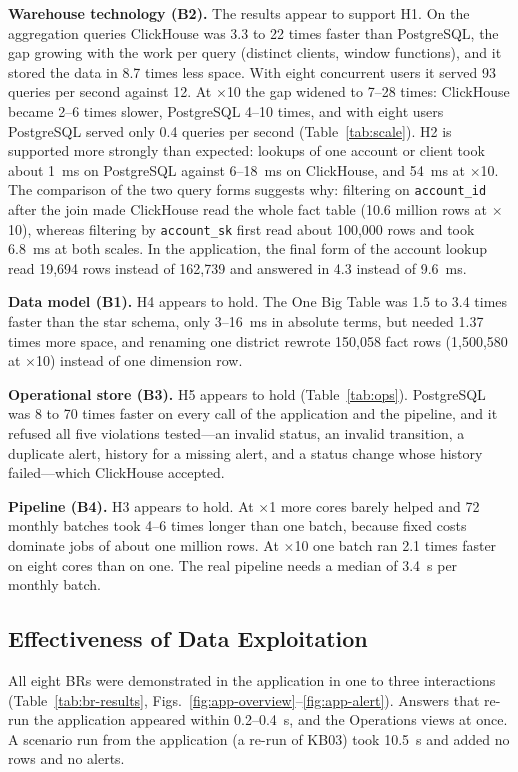 \documentclass[peerreview]{IEEEtran}
\newcommand{\tbl}[1]{\texttt{#1}}
\begin{document}
\textbf{Warehouse technology (B2).} The results appear to support H1. On the aggregation
queries ClickHouse was 3.3 to 22 times faster than PostgreSQL, the gap growing with the work
per query (distinct clients, window functions), and it stored the data in 8.7 times less
space. With eight concurrent users it served 93 queries per second against 12. At $\times$10
the gap widened to 7--28 times: ClickHouse became 2--6 times slower, PostgreSQL 4--10 times,
and with eight users PostgreSQL served only 0.4 queries per second (Table~\ref{tab:scale}).
H2 is supported more strongly than expected: lookups of one account or client took about
1~ms on PostgreSQL against 6--18~ms on ClickHouse, and 54~ms at $\times$10. The comparison of
the two query forms suggests why: filtering on \tbl{account\_id} after the join made
ClickHouse read the whole fact table (10.6 million rows at $\times$10), whereas filtering by
\tbl{account\_sk} first read about 100,000 rows and took 6.8~ms at both scales. In the
application, the final form of the account lookup read 19,694 rows instead of 162,739 and
answered in 4.3 instead of 9.6~ms.

\textbf{Data model (B1).} H4 appears to hold. The One Big Table was 1.5 to 3.4 times faster
than the star schema, only 3--16~ms in absolute terms, but needed 1.37 times more space, and
renaming one district rewrote 150,058 fact rows (1,500,580 at $\times$10) instead of one
dimension row.

\textbf{Operational store (B3).} H5 appears to hold (Table~\ref{tab:ops}). PostgreSQL was 8 to
70 times faster on every call of the application and the pipeline, and it refused all five
violations tested---an invalid status, an invalid transition, a duplicate alert, history for a
missing alert, and a status change whose history failed---which ClickHouse accepted.

\textbf{Pipeline (B4).} H3 appears to hold. At $\times$1 more cores barely helped and 72
monthly batches took 4--6 times longer than one batch, because fixed costs dominate jobs of
about one million rows. At $\times$10 one batch ran 2.1 times faster on eight cores than on
one. The real pipeline needs a median of 3.4~s per monthly batch.

\subsection{Effectiveness of Data Exploitation}
All eight BRs were demonstrated in the application in one to three interactions
(Table~\ref{tab:br-results}, Figs.~\ref{fig:app-overview}--\ref{fig:app-alert}). Answers that
re-run the application appeared within 0.2--0.4~s, and the Operations views at once. A
scenario run from the application (a re-run of KB03) took 10.5~s and added no rows and no
alerts.
\end{document}
